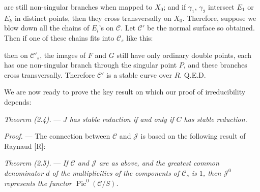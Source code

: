 \documentclass[10pt]{article}
\newcommand{\Pic}{\operatorname{Pic}}
\newcommand{\QED}{\hfill Q.E.D.}
\begin{document}
are still non-singular branches when mapped to $X_0$; and if $\gamma_1$, $\gamma_2$ intersect $E_1$ or $E_k$ in distinct points, then they cross transversally on $X_0$. Therefore, suppose we blow down all the chains of $E_i$'s on $\mathscr C$. Let $\mathscr C'$ be the normal surface so obtained. Then if one of these chains fits into $\mathscr C_s$ like this:

\begin{center}
\end{center}

then on $\mathscr C'_s$, the images of $F$ and $G$ still have only ordinary double points, each has one non-singular branch through the singular point $P$, and these branches cross transversally. Therefore $\mathscr C'$ is a stable curve over $R$. \QED


We are now ready to prove the key result on which our proof of irreducibility depends:

\medskip
\noindent\emph{Theorem (2.4).} --- \emph{$J$ has stable reduction if and only if $C$ has stable reduction.}

\noindent\emph{Proof.} --- The connection between $\mathscr C$ and $\mathscr J$ is based on the following result of Raynaud [R]:

\medskip
\noindent\emph{Theorem (2.5).} --- \emph{If $\mathscr C$ and $\mathscr J$ are as above, and the greatest common denominator $d$ of the multiplicities of the components of $\mathscr C_s$ is $1$, then $\mathscr J^0$ represents the functor $\Pic^0(\mathscr C/S)$.}
\end{document}
